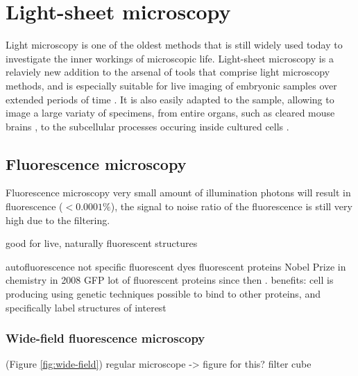 \documentclass{diploma_style}
\begin{document}
\chapter{Light-sheet microscopy}

Light microscopy is one of the oldest methods that is still widely used today to investigate the inner workings of microscopic life. Light-sheet microscopy is a relaviely new addition to the arsenal of tools that comprise light microscopy methods, and is especially suitable for live imaging of embryonic samples over extended periods of time \cite{krzic_multiview_2012,tomer_quantitative_2012}. It is also easily adapted to the sample, allowing to image a large variaty of specimens, from entire organs, such as cleared mouse brains \cite{dunsby_optically_2008}, to the subcellular processes occuring inside cultured cells \cite{capoulade_quantitative_2011}.

\section{Fluorescence microscopy}
Fluorescence microscopy \cite{lichtman_fluorescence_2005} 
 very small amount of illumination photons will result in fluorescence ($<0.0001\%$), the signal to noise ratio of the fluorescence is still very high due to the filtering.

good for live, naturally fluorescent structures

autofluorescence not specific
fluorescent dyes
fluorescent proteins
Nobel Prize in chemistry in 2008 GFP \cite{service_three_2008}
lot of fluorescent proteins since then \cite{shaner_guide_2005}. 
benefits: cell is producing
using genetic techniques possible to bind to other proteins, and specifically label structures of interest

\subsection{Wide-field fluorescence microscopy}
(Figure \ref{fig:wide-field})
regular microscope -> figure for this?
filter cube
\end{document}
